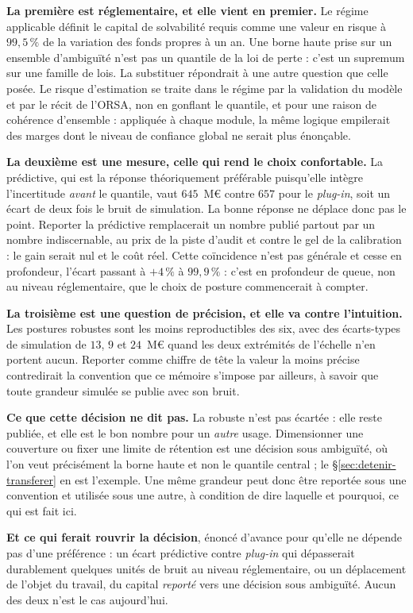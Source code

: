 \textbf{La première est réglementaire, et elle vient en premier.} Le régime applicable définit le
capital de solvabilité requis comme une valeur en risque à $99{,}5\,\%$ de la variation des fonds
propres à un an. Une borne haute prise sur un ensemble d'ambiguïté n'est pas un quantile de la loi
de perte : c'est un supremum sur une famille de lois. La substituer répondrait à une autre question
que celle posée. Le risque d'estimation se traite dans le régime par la validation du modèle et par
le récit de l'ORSA, non en gonflant le quantile, et pour une raison de cohérence d'ensemble :
appliquée à chaque module, la même logique empilerait des marges dont le niveau de confiance global
ne serait plus énonçable.

\textbf{La deuxième est une mesure, celle qui rend le choix confortable.} La prédictive,
qui est la réponse théoriquement préférable puisqu'elle intègre l'incertitude \emph{avant} le
quantile, vaut $645$~M\euro{} contre $657$ pour le \emph{plug-in}, soit un écart de deux fois le
bruit de simulation. La bonne réponse ne déplace donc pas le point. Reporter la
prédictive remplacerait un nombre publié partout par un nombre indiscernable, au prix de la piste
d'audit et contre le gel de la calibration : le gain serait nul et le coût réel. Cette
coïncidence n'est pas générale et cesse en profondeur, l'écart passant à $+4\,\%$ à
$99{,}9\,\%$ : c'est en profondeur de queue, non au niveau réglementaire, que le choix de posture
commencerait à compter.

\textbf{La troisième est une question de précision, et elle va contre l'intuition.} Les postures
robustes sont les moins reproductibles des six, avec des écarts-types de simulation de $13$, $9$
et $24$~M\euro{} quand les deux extrémités de l'échelle n'en portent aucun. Reporter comme chiffre
de tête la valeur la moins précise contredirait la convention que ce mémoire s'impose par ailleurs,
à savoir que toute grandeur simulée se publie avec son bruit.

\begin{attention}
\textbf{Ce que cette décision ne dit pas.} La robuste n'est pas écartée : elle reste publiée, et
elle est le bon nombre pour un \emph{autre} usage. Dimensionner une couverture ou fixer une limite
de rétention est une décision sous ambiguïté, où l'on veut précisément la borne haute et non le
quantile central ; le \S\ref{sec:detenir-transferer} en est l'exemple. Une même grandeur peut donc
être reportée sous une convention et utilisée sous une autre, à condition de dire laquelle et
pourquoi, ce qui est fait ici.

\textbf{Et ce qui ferait rouvrir la décision}, énoncé d'avance pour qu'elle ne dépende pas d'une
préférence : un écart prédictive contre \emph{plug-in} qui dépasserait durablement quelques unités
de bruit au niveau réglementaire, ou un déplacement de l'objet du travail, du capital
\emph{reporté} vers une décision sous ambiguïté. Aucun des deux n'est le cas aujourd'hui.
\end{attention}

